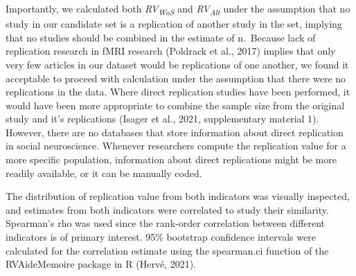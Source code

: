 \documentclass[
  man,floatsintext]{apa6}
\begin{document}
Importantly, we calculated both \emph{RV\textsubscript{WoS}} and \emph{RV\textsubscript{Alt}} under the assumption that no study in our candidate set is a replication of another study in the set, implying that no studies should be combined in the estimate of n.~Because lack of replication research in fMRI research (Poldrack et al., 2017) implies that only very few articles in our dataset would be replications of one another, we found it acceptable to proceed with calculation under the assumption that there were no replications in the data. Where direct replication studies have been performed, it would have been more appropriate to combine the sample size from the original study and it's replications (Isager et al., 2021, supplementary material 1). However, there are no databases that store information about direct replication in social neuroscience. Whenever researchers compute the replication value for a more specific population, information about direct replications might be more readily available, or it can be manually coded.

The distribution of replication value from both indicators was visually inspected, and estimates from both indicators were correlated to study their similarity. Spearman's rho was used since the rank-order correlation between different indicators is of primary interest. 95\% bootstrap confidence intervals were calculated for the correlation estimate using the spearman.ci function of the RVAideMemoire package in R (Hervé, 2021).
\end{document}

